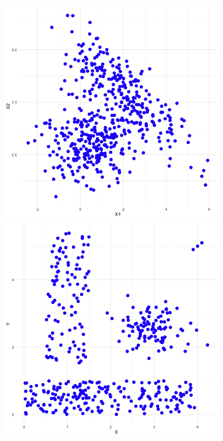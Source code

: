 \documentclass{article}
\begin{document}
\begin{figure}[ht]
  \centering
  \begin{multicols}{3}
    \includegraphics[width=\linewidth]{engytime.png}\par 
    \includegraphics[width=\linewidth]{lsun3d.png}\par 

\end{multicols}
\end{figure}
\end{document}
